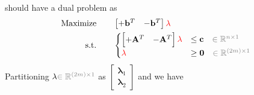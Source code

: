 \documentclass[twocolumn]{ctexart}
\begin{document}
should have a dual problem as
\begin{equation}
    \begin{aligned}
        \label{eq:primal_standard_dual}
        \text{Maximize} \qquad &
            \begin{bmatrix}  +\mathbf{b}^T  &  -\mathbf{b}^T \end{bmatrix}
            \mathbf{\color{red} \lambda}
        \\
        \text{s.t.} \qquad &
            \begin{cases}
                \begin{bmatrix}  +\mathbf{A}^T  &  -\mathbf{A}^T \end{bmatrix}
                \mathbf{\color{red} \lambda}  &  \leq  \mathbf{c}  {\color{gray} \quad \in \mathbb{R}^{n \times 1}}  \\
                \mathbf{\color{red} \lambda}  &  \geq  \mathbf{0}  {\color{gray} \quad \in \mathbb{R}^{(2m) \times 1}}  \\
            \end{cases}
    \end{aligned}
\end{equation}
Partitioning $\mathbf{\lambda} {\color{gray} \in \mathbb{R}^{(2m) \times 1}}$
as $\begin{bmatrix}  \mathbf{\lambda}_1  \\  \mathbf{\lambda}_2 \end{bmatrix}$
and we have
\end{document}
